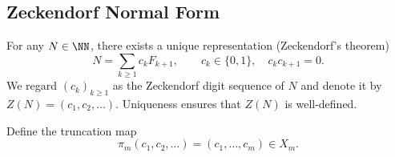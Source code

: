 \subsection{Zeckendorf Normal Form}\label{subsec:folding-zeckendorf-canonical}

For any $N\in\NN$, there exists a unique representation (Zeckendorf's theorem)
\[
N=\sum_{k\ge1}c_k F_{k+1},\qquad c_k\in\{0,1\},\quad c_kc_{k+1}=0.
\]
We regard $(c_k)_{k\ge1}$ as the Zeckendorf digit sequence of $N$ and denote it by $Z(N)=(c_1,c_2,\dots)$. Uniqueness ensures that $Z(N)$ is well-defined.

Define the truncation map
\[
\pi_m(c_1,c_2,\dots)=(c_1,\dots,c_m)\in X_m.
\]
